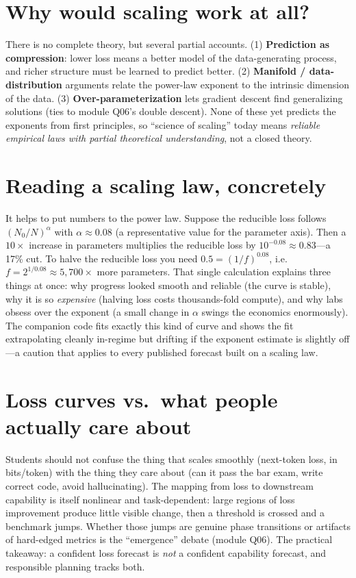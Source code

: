 \documentclass[11pt]{article}
\begin{document}
\section{Why would scaling work at all?}
There is no complete theory, but several partial accounts. (1) \textbf{Prediction as compression}: lower
loss means a better model of the data-generating process, and richer structure must be learned to predict
better. (2) \textbf{Manifold / data-distribution} arguments relate the power-law exponent to the
intrinsic dimension of the data. (3) \textbf{Over-parameterization} lets gradient descent find
generalizing solutions (ties to module Q06's double descent). None of these yet predicts the exponents
from first principles, so ``science of scaling'' today means \emph{reliable empirical laws with partial
theoretical understanding}, not a closed theory.

\section{Reading a scaling law, concretely}
It helps to put numbers to the power law. Suppose the reducible loss follows $(N_0/N)^{\alpha}$ with
$\alpha \approx 0.08$ (a representative value for the parameter axis). Then a $10\times$ increase in
parameters multiplies the reducible loss by $10^{-0.08} \approx 0.83$---a 17\% cut. To halve the reducible
loss you need $0.5 = (1/f)^{0.08}$, i.e.\ $f = 2^{1/0.08} \approx 5{,}700\times$ more parameters. That
single calculation explains three things at once: why progress looked smooth and reliable (the curve is
stable), why it is so \emph{expensive} (halving loss costs thousands-fold compute), and why labs obsess
over the exponent (a small change in $\alpha$ swings the economics enormously). The companion code fits
exactly this kind of curve and shows the fit extrapolating cleanly in-regime but drifting if the exponent
estimate is slightly off---a caution that applies to every published forecast built on a scaling law.

\section{Loss curves vs.\ what people actually care about}
Students should not confuse the thing that scales smoothly (next-token loss, in bits/token) with the thing
they care about (can it pass the bar exam, write correct code, avoid hallucinating). The mapping from loss
to downstream capability is itself nonlinear and task-dependent: large regions of loss improvement produce
little visible change, then a threshold is crossed and a benchmark jumps. Whether those jumps are genuine
phase transitions or artifacts of hard-edged metrics is the ``emergence'' debate (module Q06). The
practical takeaway: a confident loss forecast is \emph{not} a confident capability forecast, and
responsible planning tracks both.
\end{document}
